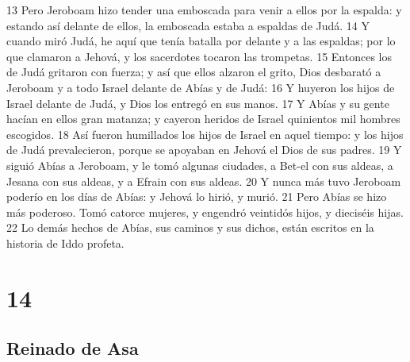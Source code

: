 13 Pero Jeroboam hizo tender una emboscada para venir a ellos por la espalda: y estando así delante de ellos, la emboscada estaba a espaldas de Judá.
14 Y cuando miró Judá, he aquí que tenía batalla por delante y a las espaldas; por lo que clamaron a Jehová, y los sacerdotes tocaron las trompetas.
15 Entonces los de Judá gritaron con fuerza; y así que ellos alzaron el grito, Dios desbarató a Jeroboam y a todo Israel delante de Abías y de Judá:
16 Y huyeron los hijos de Israel delante de Judá, y Dios los entregó en sus manos.
17 Y Abías y su gente hacían en ellos gran matanza; y cayeron heridos de Israel quinientos mil hombres escogidos.
18 Así fueron humillados los hijos de Israel en aquel tiempo: y los hijos de Judá prevalecieron, porque se apoyaban en Jehová el Dios de sus padres.
19 Y siguió Abías a Jeroboam, y le tomó algunas ciudades, a Bet-el con sus aldeas, a Jesana con sus aldeas, y a Efrain con sus aldeas.
20 Y nunca más tuvo Jeroboam poderío en los días de Abías: y Jehová lo hirió, y murió.
21 Pero Abías se hizo más poderoso. Tomó catorce mujeres, y engendró veintidós hijos, y dieciséis hijas.
22 Lo demás hechos de Abías, sus caminos y sus dichos, están escritos en la historia de Iddo profeta.

\chapter{14}

\section*{Reinado de Asa}

 

